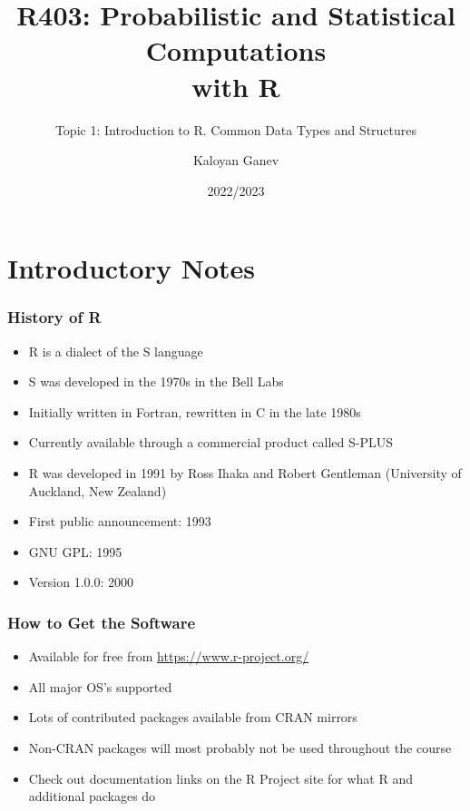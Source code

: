 \documentclass[10pt]{beamer}
\title{R403: Probabilistic and Statistical Computations\\ with R}
\subtitle{Topic 1: \textcolor{myred}{Introduction to R. Common Data Types and Structures}}
\author{Kaloyan Ganev}
\date{2022/2023}
\theoremstyle{definition}
\begin{document}
\frame{\titlepage}

\begin{frame}
\tableofcontents[hideallsubsections]
\end{frame}

\hypertarget{introductory-notes}{%
\section{Introductory Notes}\label{introductory-notes}}

\begin{frame}[fragile]
\frametitle{History of R}
\begin{itemize}
	\item R is a dialect of the S language
	
	\item S was developed in the 1970s in the Bell Labs

	\item Initially written in Fortran, rewritten in C in the late 1980s

	\item Currently available through a commercial product called S-PLUS

	\item R was developed in 1991 by Ross Ihaka and Robert Gentleman (University of Auckland, New Zealand)
	
	\item First public announcement: 1993
	
	\item GNU GPL: 1995
	
	\item Version 1.0.0: 2000
\end{itemize}
\end{frame}

\begin{frame}[fragile]
\frametitle{How to Get the Software}
\begin{itemize}
	\item Available for free from \url{https://www.r-project.org/}
	
	\item All major OS's supported
	
	\item Lots of contributed packages available from CRAN mirrors

	\item Non-CRAN packages will most probably not be used throughout the course
	
	\item Check out documentation links on the R Project site for what R and additional packages do
\end{itemize}
\end{frame}
\end{document}
